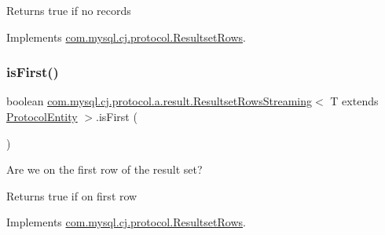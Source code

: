 \begin{DoxyReturn}{Returns}
true if no records 
\end{DoxyReturn}


Implements \mbox{\hyperlink{interfacecom_1_1mysql_1_1cj_1_1protocol_1_1_resultset_rows_ae130183c4bba57a93d3fe890f14b6c25}{com.\+mysql.\+cj.\+protocol.\+Resultset\+Rows}}.

\mbox{\label{classcom_1_1mysql_1_1cj_1_1protocol_1_1a_1_1result_1_1_resultset_rows_streaming_a723004a61b6ca61f2da79c7876c62502}} 
\subsubsection{\texorpdfstring{is\+First()}{isFirst()}}
{\footnotesize\ttfamily boolean \mbox{\hyperlink{classcom_1_1mysql_1_1cj_1_1protocol_1_1a_1_1result_1_1_resultset_rows_streaming}{com.\+mysql.\+cj.\+protocol.\+a.\+result.\+Resultset\+Rows\+Streaming}}$<$ T extends \mbox{\hyperlink{interfacecom_1_1mysql_1_1cj_1_1protocol_1_1_protocol_entity}{Protocol\+Entity}} $>$.is\+First (\begin{DoxyParamCaption}{ }\end{DoxyParamCaption})}

Are we on the first row of the result set?

\begin{DoxyReturn}{Returns}
true if on first row 
\end{DoxyReturn}


Implements \mbox{\hyperlink{interfacecom_1_1mysql_1_1cj_1_1protocol_1_1_resultset_rows_ae7d5b7ca8787eaca7ee5e0ca69ac2818}{com.\+mysql.\+cj.\+protocol.\+Resultset\+Rows}}.

\mbox{\label{classcom_1_1mysql_1_1cj_1_1protocol_1_1a_1_1result_1_1_resultset_rows_streaming_abe926437ff8f266271a0e2403404dbc4}} 

